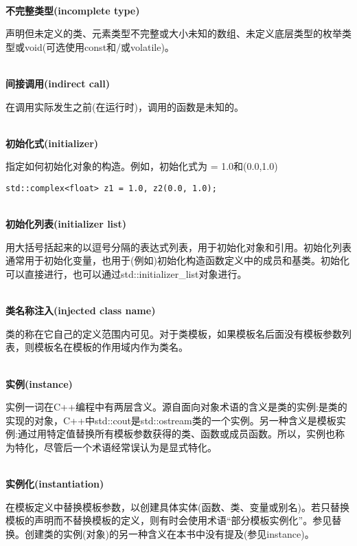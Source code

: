 \hspace*{\fill} \\ %
\noindent
\textbf{不完整类型(incomplete type)}

声明但未定义的类、元素类型不完整或大小未知的数组、未定义底层类型的枚举类型或void(可选使用const和/或volatile)。

\hspace*{\fill} \\ %
\noindent
\textbf{间接调用(indirect call)}

在调用实际发生之前(在运行时)，调用的函数是未知的。

\hspace*{\fill} \\ %
\noindent
\textbf{初始化式(initializer)}

指定如何初始化对象的构造。例如，初始化式为 = 1.0和(0.0,1.0)
\begin{lstlisting}[style=styleCXX]
std::complex<float> z1 = 1.0, z2(0.0, 1.0);
\end{lstlisting}

\hspace*{\fill} \\ %
\noindent
\textbf{初始化列表(initializer list)}

用大括号括起来的以逗号分隔的表达式列表，用于初始化对象和引用。初始化列表通常用于初始化变量，也用于(例如)初始化构造函数定义中的成员和基类。初始化可以直接进行，也可以通过std::initializer\_list对象进行。

\hspace*{\fill} \\ %
\noindent
\textbf{类名称注入(injected class name)}

类的称在它自己的定义范围内可见。对于类模板，如果模板名后面没有模板参数列表，则模板名在模板的作用域内作为类名。

\hspace*{\fill} \\ %
\noindent
\textbf{实例(instance)}

实例一词在C++编程中有两层含义。源自面向对象术语的含义是类的实例:是类的实现的对象，C++中std::cout是std::ostream类的一个实例。另一种含义是模板实例:通过用特定值替换所有模板参数获得的类、函数或成员函数。所以，实例也称为特化，尽管后一个术语经常误认为是显式特化。

\hspace*{\fill} \\ %
\noindent
\textbf{实例化(instantiation)}

在模板定义中替换模板参数，以创建具体实体(函数、类、变量或别名)。若只替换模板的声明而不替换模板的定义，则有时会使用术语“部分模板实例化”。参见替换。创建类的实例(对象)的另一种含义在本书中没有提及(参见instance)。

